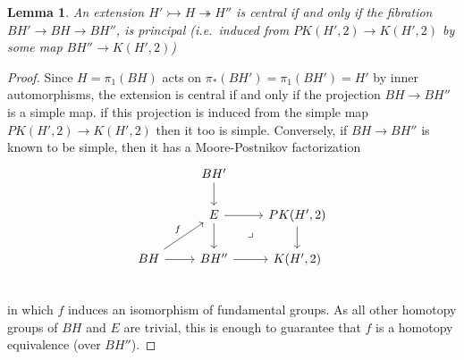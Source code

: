 \documentclass[openany,leqno]{book}  %
\newtheorem{lemma}[theorem]{Lemma}
\begin{document}
\begin{lemma}
  An extension $H'\rightarrowtail H \twoheadrightarrow H''$ is central if and only if the fibration $BH' \rightarrow  BH\rightarrow  BH''$, is principal (i.e.\  induced from $PK(H', 2)\longrightarrow K(H', 2)$ by some map $BH''\longrightarrow K(H', 2)$)
\end{lemma}
\begin{proof}
Since $H = \pi_1 (BH)$ acts on $\pi_*(BH') = \pi_1 (BH') = H'$ by inner automorphisms, the
extension is central if and only if the projection $BH \longrightarrow BH''$ is a simple map. if this projection is induced from the simple map $PK(H', 2) \longrightarrow K(H', 2)$ then it too is simple. Conversely, if $BH \longrightarrow BH''$ is known to be simple, then it has a Moore-Postnikov factorization
\[
\begin{tikzcd}
  & BH' \arrow[d] & \\
  & E \arrow[d] \arrow[r] \arrow[dr, phantom, "\lrcorner"] &PK(H',2) \arrow[d] \\
 BH \arrow[ru,"f"] \arrow[r] &BH'' \arrow[r] & K(H',2)\\  
\end{tikzcd}
\]
 in which $f$ induces an isomorphism of fundamental groups. As all other homotopy groups of $BH$ and $E$ are trivial, this is enough to guarantee that $f$ is a homotopy equivalence (over $BH''$).
\end{proof}
\end{document}
